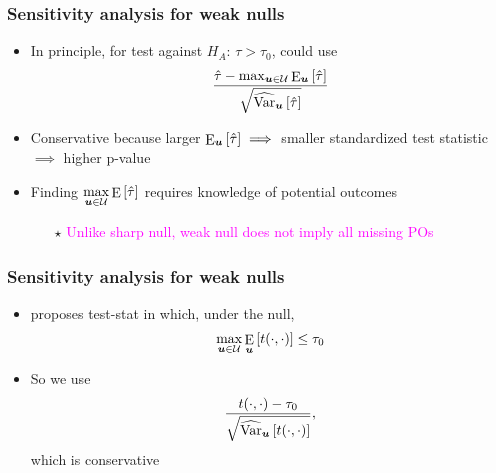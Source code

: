 \documentclass[table, xcolor = {dvipsnames}, 9pt]{beamer}
\theoremstyle{plain}
\DeclareMathOperator{\E}{\rm{E}}
\DeclareMathOperator{\Var}{\rm{Var}}
\begin{document}
\begin{frame}[t]
\frametitle{Sensitivity analysis for weak nulls}
\vfill
\begin{itemize} \vfill
\item In principle, for test against $H_A: \, \tau > \tau_0$, could use
\begin{equation}
\dfrac{\hat{\tau} - \max_{\bm{u} \in \mathcal{U}} \E_{\bm{u}}\left[\hat{\tau}\right]}{\sqrt{\widehat{\Var}_{\bm{u}}\left[\hat{\tau}\right]}}
\end{equation} \vfill
\item Conservative because larger $\E_{\bm{u}}\left[\hat{\tau}\right] \implies $ smaller standardized test statistic $\implies$ higher p-value \vfill
\item Finding $\max \limits_{\bm{u} \in \mathcal{U}} \E\left[\hat{\tau}\right]$ requires knowledge of potential outcomes \vfill
\begin{itemize} \vfill
\item[$\star$] \textcolor{magenta}{Unlike sharp null, weak null does not imply all missing POs} \vfill
\end{itemize} \vfill
\end{itemize} \vfill
\vfill
\end{frame}
\begin{frame}[t]
\frametitle{Sensitivity analysis for weak nulls}
\vfill
\begin{itemize} \vfill
\item \citet{fogarty2023} proposes test-stat in which, under the null,
\begin{equation*}
\max \limits_{\bm{u} \in \mathcal{U}} \E_{\bm{u}}\left[t(\cdot, \cdot)\right] \leq \tau_0
\end{equation*} \vfill
\item So we use
\begin{equation}
\dfrac{t(\cdot, \cdot) - \tau_0}{\sqrt{\widehat{\Var}_{\bm{u}}\left[t(\cdot, \cdot)\right]}},
\end{equation} \vfill
which is conservative \vfill
\end{itemize}
\vfill
\end{frame}
\end{document}
